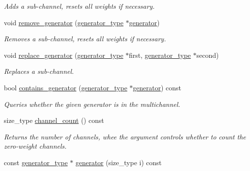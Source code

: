 \begin{DoxyCompactItemize}
\begin{DoxyCompactList}\small\item\em Adds a sub-\/channel, resets all weights if necessary. \end{DoxyCompactList}\item 
\hypertarget{a00379_a6c628b99b1a411129e0a9a73357f23ae}{}void \hyperlink{a00379_a6c628b99b1a411129e0a9a73357f23ae}{remove\+\_\+generator} (\hyperlink{a00366}{generator\+\_\+type} $\ast$\hyperlink{a00379_adf7372bbbcd347dde1ee06ee3dfd9242}{generator})\label{a00379_a6c628b99b1a411129e0a9a73357f23ae}

\begin{DoxyCompactList}\small\item\em Removes a sub-\/channel, resets all weights if necessary. \end{DoxyCompactList}\item 
\hypertarget{a00379_a56a0a2847cbd2c9e65586a6aa6dd426b}{}void \hyperlink{a00379_a56a0a2847cbd2c9e65586a6aa6dd426b}{replace\+\_\+generator} (\hyperlink{a00366}{generator\+\_\+type} $\ast$first, \hyperlink{a00366}{generator\+\_\+type} $\ast$second)\label{a00379_a56a0a2847cbd2c9e65586a6aa6dd426b}

\begin{DoxyCompactList}\small\item\em Replaces a sub-\/channel. \end{DoxyCompactList}\item 
\hypertarget{a00379_a8568dba076981c43d38f2a745f08c56b}{}bool \hyperlink{a00379_a8568dba076981c43d38f2a745f08c56b}{contains\+\_\+generator} (\hyperlink{a00366}{generator\+\_\+type} $\ast$\hyperlink{a00379_adf7372bbbcd347dde1ee06ee3dfd9242}{generator}) const \label{a00379_a8568dba076981c43d38f2a745f08c56b}

\begin{DoxyCompactList}\small\item\em Queries whether the given generator is in the multichannel. \end{DoxyCompactList}\item 
size\+\_\+type \hyperlink{a00379_adbc1a1152bf4226cfcac887923c85366}{channel\+\_\+count} () const 
\begin{DoxyCompactList}\small\item\em Returns the number of channels, whee the argument controls whether to count the zero-\/weight channels. \end{DoxyCompactList}\item 
\hypertarget{a00379_adf7372bbbcd347dde1ee06ee3dfd9242}{}const \hyperlink{a00366}{generator\+\_\+type} $\ast$ \hyperlink{a00379_adf7372bbbcd347dde1ee06ee3dfd9242}{generator} (size\+\_\+type i) const \label{a00379_adf7372bbbcd347dde1ee06ee3dfd9242}


\end{DoxyCompactItemize}
